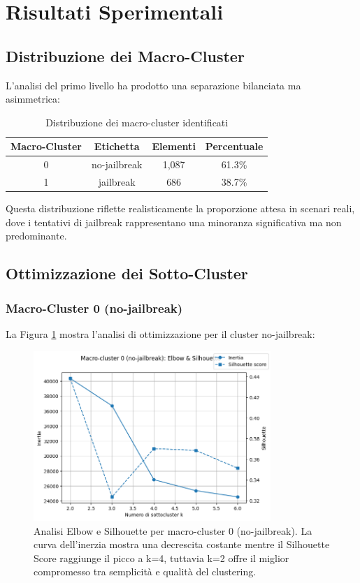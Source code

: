 \documentclass[12pt,a4paper]{article}
\begin{document}
\section{Risultati Sperimentali}

\subsection{Distribuzione dei Macro-Cluster}

L'analisi del primo livello ha prodotto una separazione bilanciata ma asimmetrica:

\begin{table}[H]
\centering
\begin{tabular}{cccc}
\toprule
\textbf{Macro-Cluster} & \textbf{Etichetta} & \textbf{Elementi} & \textbf{Percentuale} \\
\midrule
0 & no-jailbreak & 1,087 & 61.3\% \\
1 & jailbreak & 686 & 38.7\% \\
\bottomrule
\end{tabular}
\caption{Distribuzione dei macro-cluster identificati}
\label{tab:macro_distribution}
\end{table}

Questa distribuzione riflette realisticamente la proporzione attesa in scenari reali, dove i tentativi di jailbreak rappresentano una minoranza significativa ma non predominante.

\subsection{Ottimizzazione dei Sotto-Cluster}

\subsubsection{Macro-Cluster 0 (no-jailbreak)}

La Figura \ref{fig:elbow_no_jailbreak} mostra l'analisi di ottimizzazione per il cluster no-jailbreak:

\begin{figure}[H]
    \centering
    \includegraphics[width=0.8\textwidth]{elbowcluster0.png}
    \caption{Analisi Elbow e Silhouette per macro-cluster 0 (no-jailbreak). La curva dell'inerzia mostra una decrescita costante mentre il Silhouette Score raggiunge il picco a k=4, tuttavia k=2 offre il miglior compromesso tra semplicità e qualità del clustering.}
    \label{fig:elbow_no_jailbreak}
\end{figure}
\end{document}
